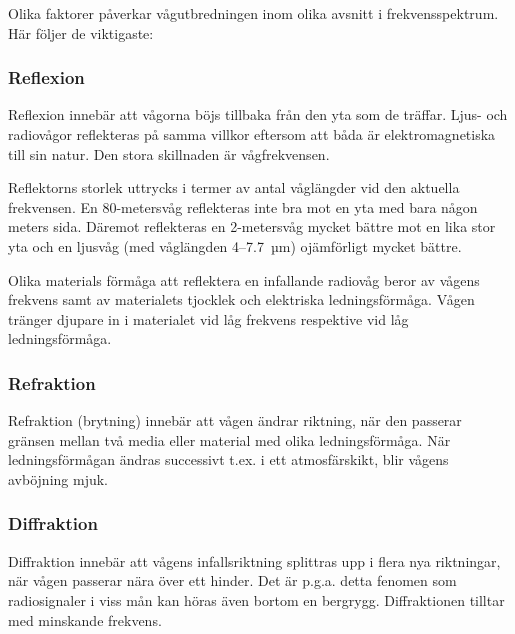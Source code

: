 Olika faktorer påverkar vågutbredningen inom olika avsnitt i
frekvensspektrum. Här följer de viktigaste:

\subsubsection{Reflexion}

Reflexion innebär att vågorna böjs tillbaka från den yta som de
träffar. Ljus- och radiovågor reflekteras på samma villkor eftersom
att båda är elektromagnetiska till sin natur.
Den stora skillnaden är vågfrekvensen.

Reflektorns storlek uttrycks i termer av antal våglängder vid den
aktuella frekvensen.
En 80-metersvåg reflekteras inte bra mot en yta med bara någon meters sida.
Däremot reflekteras en 2-metersvåg mycket bättre mot en lika stor yta och en
ljusvåg (med våglängden 4--7.7~µm) ojämförligt mycket bättre.

Olika materials förmåga att reflektera en infallande radiovåg beror av
vågens frekvens samt av materialets tjocklek och elektriska
ledningsförmåga. Vågen tränger djupare in i materialet vid låg
frekvens respektive vid låg ledningsförmåga.

\subsubsection{Refraktion}

Refraktion (brytning) innebär att vågen ändrar riktning, när den
passerar gränsen mellan två media eller material med olika
ledningsförmåga. När ledningsförmågan ändras successivt t.ex. i ett
atmosfärskikt, blir vågens avböjning mjuk.

\subsubsection{Diffraktion}

Diffraktion innebär att vågens infallsriktning splittras upp i flera
nya riktningar, när vågen passerar nära över ett hinder. Det är p.g.a.
detta fenomen som radiosignaler i viss mån kan höras även bortom en
bergrygg. Diffraktionen tilltar med minskande frekvens.
